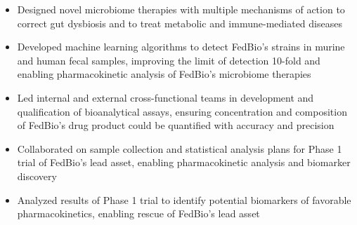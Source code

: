\documentclass[letterpaper,10pt]{article}
\begin{document}
\begin{itemize}
\begin{itemize}
			\item Designed novel microbiome therapies with multiple mechanisms of action to correct gut dysbiosis and to treat metabolic and immune-mediated diseases
			\item Developed machine learning algorithms to detect FedBio's strains in murine and human fecal samples, improving the limit of detection 10-fold and enabling pharmacokinetic analysis of FedBio's microbiome therapies
			\item Led internal and external cross-functional teams in development and qualification of bioanalytical assays, ensuring concentration and composition of FedBio's drug product could be quantified with accuracy and precision
			\item Collaborated on sample collection and statistical analysis plans for Phase 1 trial of FedBio's lead asset, enabling pharmacokinetic analysis and biomarker discovery
			\item Analyzed results of Phase 1 trial to identify potential biomarkers of favorable pharmacokinetics, enabling rescue of FedBio's lead asset
			


\end{itemize}
\end{itemize}
\end{document}
